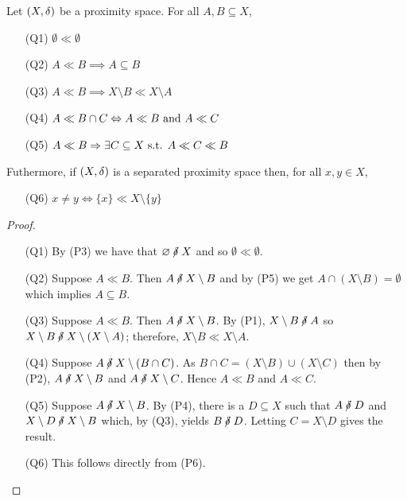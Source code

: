 \begin{proposition}
	\label{llprops}
	Let \( (X,\mathord{\delta}) \) be a proximity space.  For all \( A,B \subseteq X \),
	\begin{enumerate}
		\item[(Q1)]
			\( \emptyset \ll \emptyset \)
		\item[(Q2)]
			\( A \ll B \implies A \subseteq B \)
		\item[(Q3)]
			\( A \ll B \implies X \setminus B \ll X \setminus A \)
		\item[(Q4)]
			\( A \ll B \cap C \Leftrightarrow A \ll B \text{ and } A \ll C \)
		\item[(Q5)]
			\( A \ll B \Rightarrow \exists C \subseteq X \text{ s.t. } A \ll C \ll B \)
	\end{enumerate}
	Futhermore, if \( (X,\mathord{\delta}) \) is a separated proximity space then, for all \( x,y \in X \),
	\begin{enumerate}
		\item[(Q6)]
			\( x \neq y \iff \{x\} \ll X \setminus \{y\} \)
	\end{enumerate}
\end{proposition}
\begin{proof}
	\leavevmode
	\begin{enumerate}
		\item[(Q1)] By (P3) we have that \( \emptyset \nnear X \) and so \( \emptyset \ll \emptyset \).
		\item[(Q2)] Suppose \( A \ll B \).  Then \( A \nnear X \setminus B \) and by (P5) we get \( A \cap (X \setminus B) = \emptyset \) which implies \( A \subseteq B \).
		\item[(Q3)] Suppose \( A \ll B \).  Then \( A \nnear X \setminus B \).  By (P1), \( X \setminus B \nnear A \) so \( X \setminus B \nnear X \setminus (X \setminus A) \); therefore, \( X \setminus B \ll X \setminus A \).
		\item[(Q4)] Suppose \( A \nnear X \setminus (B \cap C) \).  As \( B \cap C = (X \setminus B) \cup (X \setminus C) \) then by (P2), \( A \nnear X \setminus B \) and \( A \nnear X \setminus C \).  Hence \( A \ll B \) and \( A \ll C \).
		\item[(Q5)] Suppose \( A \nnear X \setminus B \).  By (P4), there is a \( D \subseteq X \) such that \( A \nnear D \) and \( X \setminus D \nnear X \setminus B \) which, by (Q3), yields \( B \nnear D \).  Letting \( C = X \setminus D \) gives the result.
		\item[(Q6)] This follows directly from (P6).
	\end{enumerate}
\end{proof}


